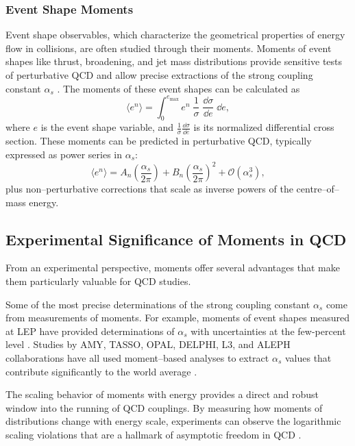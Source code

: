         \subsubsection{Event Shape Moments}
            Event shape observables, which characterize the geometrical properties of energy flow in collisions, are often studied through their moments.
            Moments of event shapes like thrust, broadening, and jet mass distributions provide sensitive tests of perturbative QCD and allow precise extractions of the strong coupling constant $\alpha_s$ .
            The moments of these event shapes can be calculated as
            \[
                \langle e^n \rangle = \int_0^{e_{\text{max}}} e^n \;\frac{1}{\sigma}\; \frac{\dd\sigma}{\dd e}\; \dd e,
            \]
            where $e$ is the event shape variable, and $\frac{1}{\sigma} \frac{\dd\sigma}{\dd e}$ is its normalized differential cross section.
            These moments can be predicted in perturbative QCD, typically expressed as power series in $\alpha_s$:
            \[
                \langle e^n \rangle = A_n \left(\frac{\alpha_s}{2\pi}\right) + B_n \left(\frac{\alpha_s}{2\pi}\right)^2 + \mathcal{O}(\alpha_s^3),
            \]
            plus non--perturbative corrections that scale as inverse powers of the centre--of--mass energy.
    \subsection{Experimental Significance of Moments in QCD}
        From an experimental perspective, moments offer several advantages that make them particularly valuable for QCD studies.

        Some of the most precise determinations of the strong coupling constant $\alpha_s$ come from measurements of moments.
        For example, moments of event shapes measured at LEP have provided determinations of $\alpha_s$ with uncertainties at the few-percent level .
        Studies by AMY, TASSO, OPAL, DELPHI, L3, and ALEPH collaborations have all used moment--based analyses to extract $\alpha_s$ values that contribute significantly to the world average .

        The scaling behavior of moments with energy provides a direct and robust window into the running of QCD couplings.
        By measuring how moments of distributions change with energy scale, experiments can observe the logarithmic scaling violations that are a hallmark of asymptotic freedom in QCD .

